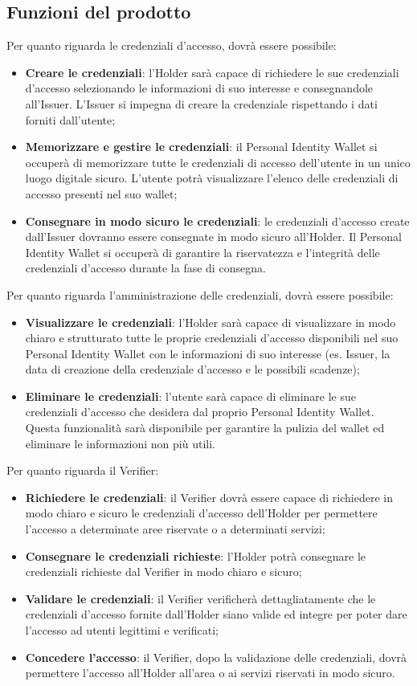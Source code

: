 \subsection{Funzioni del prodotto}
Per quanto riguarda le credenziali d’accesso, dovrà essere possibile: 
\begin{itemize}
    \item \textbf{Creare le credenziali}: l’Holder sarà capace di richiedere le sue credenziali d’accesso selezionando le informazioni di suo interesse e consegnandole all’Issuer. L’Issuer si impegna di creare la credenziale rispettando i dati forniti dall’utente;
    \item \textbf{Memorizzare e gestire le credenziali}: il Personal Identity Wallet si occuperà di memorizzare tutte le credenziali di accesso dell’utente in un unico luogo digitale sicuro. L’utente potrà visualizzare l’elenco delle credenziali di accesso presenti nel suo wallet;
    \item \textbf{Consegnare in modo sicuro le credenziali}: le credenziali d’accesso create dall’Issuer dovranno essere consegnate in modo sicuro all’Holder. Il Personal Identity Wallet si occuperà di garantire la riservatezza e l’integrità delle credenziali d’accesso durante la fase di consegna.
\end{itemize}
Per quanto riguarda l’amministrazione delle credenziali, dovrà essere possibile: 
\begin{itemize}
    \item \textbf{Visualizzare le credenziali}: l’Holder sarà capace di visualizzare in modo chiaro e strutturato tutte le proprie credenziali d’accesso disponibili nel suo Personal Identity Wallet con le informazioni di suo interesse (es. Issuer, la data di creazione della credenziale d’accesso e le possibili scadenze);
    \item \textbf{Eliminare le credenziali}: l’utente sarà capace di eliminare le sue credenziali d’accesso che desidera dal proprio Personal Identity Wallet. Questa funzionalità sarà disponibile per garantire la pulizia del wallet ed eliminare le informazioni non più utili.
\end{itemize}
Per quanto riguarda il Verifier: 
\begin{itemize}
    \item \textbf{Richiedere le credenziali}: il Verifier dovrà essere capace di richiedere in modo chiaro e sicuro le credenziali d’accesso dell’Holder per permettere l’accesso a determinate aree riservate o a determinati servizi;
    \item \textbf{Consegnare le credenziali richieste}: l’Holder potrà consegnare le credenziali richieste dal Verifier in modo chiaro e sicuro;
    \item \textbf{Validare le credenziali}: il Verifier verificherà dettagliatamente che le credenziali d’accesso fornite dall’Holder siano valide ed integre per poter dare l’accesso ad utenti legittimi e verificati;
    \item \textbf{Concedere l'accesso}: il Verifier, dopo la validazione delle credenziali, dovrà permettere l’accesso all’Holder all’area o ai servizi riservati in modo sicuro.
\end{itemize}

